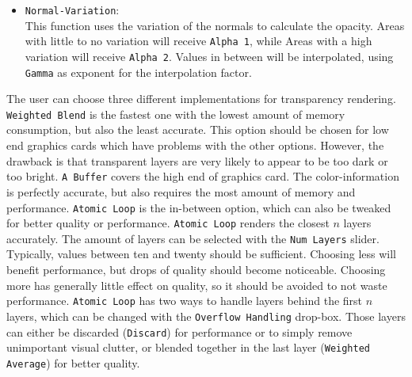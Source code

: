 \begin{itemize}
\item \texttt{Normal-Variation}:\\
This function uses the variation of the normals to calculate the opacity. Areas with little to no variation will receive \texttt{Alpha 1}, while Areas with a high variation will receive \texttt{Alpha 2}. Values in between will be interpolated, using \texttt{Gamma} as exponent for the interpolation factor.
\end{itemize}
The user can choose three different implementations for transparency rendering. \texttt{Weighted Blend} is the fastest one with the lowest amount of memory consumption, but also the least accurate. This option should be chosen for low end graphics cards which have problems with the other options. However, the drawback is that transparent layers are very likely to appear to be too dark or too bright. \texttt{A Buffer} covers the high end of graphics card. The color-information is perfectly accurate, but also requires the most amount of memory and performance. \texttt{Atomic Loop} is the in-between option, which can also be tweaked for better quality or performance. \texttt{Atomic Loop} renders the closest $n$ layers accurately. The amount of layers can be selected with the \texttt{Num Layers} slider. Typically, values between ten and twenty should be sufficient. Choosing less will benefit performance, but drops of quality should become noticeable. Choosing more has generally little effect on quality, so it should be avoided to not waste performance. \texttt{Atomic Loop} has two ways to handle layers behind the first $n$ layers, which can be changed with the \texttt{Overflow Handling} drop-box. Those layers can either be discarded (\texttt{Discard}) for performance or to simply remove unimportant visual clutter, or blended together in the last layer (\texttt{Weighted Average}) for better quality.